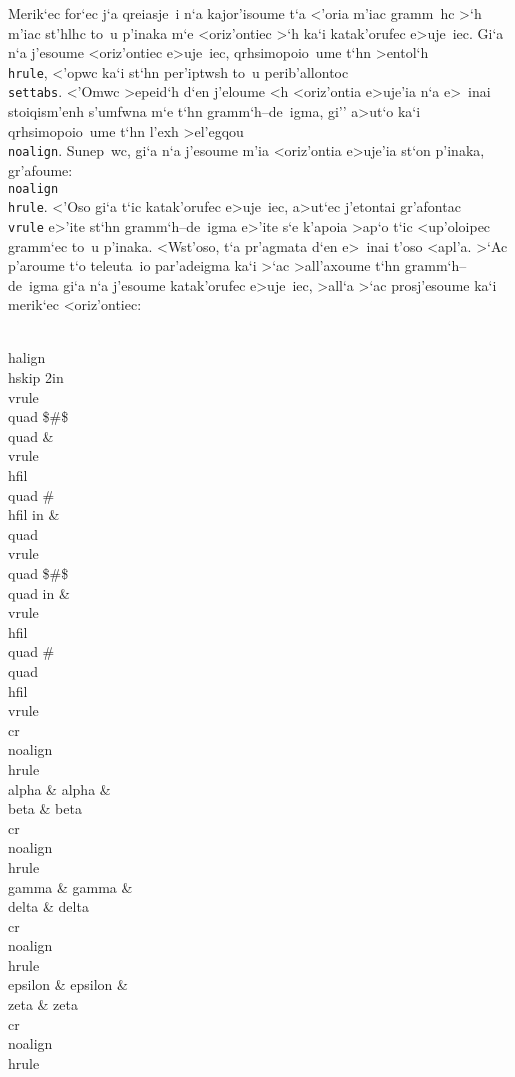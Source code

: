 Merik`ec for`ec j`a qreiasje~i n`a kajor'isoume t`a <'oria m'iac
gramm~hc >`h m'iac st'hlhc to~u p'inaka m`e <oriz'ontiec >`h ka`i
katak'orufec e>uje~iec.  Gi`a n`a j'esoume <oriz'ontiec e>uje~iec,
qrhsimopoio~ume t`hn >entol`h {\tt\\hrule}, <'opwc ka`i st`hn       
per'iptwsh to~u perib'allontoc  {\tt \\settabs}. <'Omwc >epeid`h d`en
j'eloume <h <oriz'ontia e>uje'ia n`a e>~inai stoiqism'enh s'umfwna m`e
t`hn gramm`h--de~igma, gi'' a>ut`o ka`i qrhsimopoio~ume t`hn l'exh      
>el'egqou {\tt \\noalign}. Sunep~wc, gi`a n`a j'esoume m'ia <oriz'ontia
e>uje'ia st`on p'inaka, gr'afoume: {\tt \\noalign\lb\\hrule\rb}. <'Oso
gi`a t`ic katak'orufec e>uje~iec, a>ut`ec j'etontai gr'afontac {\tt
\\vrule} e>'ite st`hn gramm`h--de~igma e>'ite s`e k'apoia >ap`o t`ic
<up'oloipec gramm`ec to~u p'inaka.  <Wst'oso, t`a pr'agmata d`en e>~inai
t'oso <apl'a.  >`Ac p'aroume t`o teleuta~io par'adeigma ka`i >`ac
>all'axoume t`hn gramm`h--de~igma gi`a n`a j'esoume katak'orufec
e>uje~iec, >all`a >`ac prosj'esoume ka`i merik`ec <oriz'ontiec:
 
\beginuser 
\\halign\lb\\hskip 2in\\vrule\\quad \$\#\$\\quad \& \\vrule \\hfil\\quad %
\# \\hfil 
{} in \& \\quad \\vrule \\quad \$\#\$\\quad 
{} in \& \\vrule\\hfil \\quad \# \\quad \\hfil \\vrule \\cr 
\\noalign\lb\\hrule\rb 
\\alpha   \& alpha   \& \\beta  \& beta \\cr 
\\noalign\lb\\hrule\rb 
\\gamma   \& gamma   \& \\delta \& delta \\cr 
\\noalign\lb\\hrule\rb 
\\epsilon \& epsilon \& \\zeta  \& zeta \\cr 
\\noalign\lb\\hrule\rb 
\rb 
\enduser 

